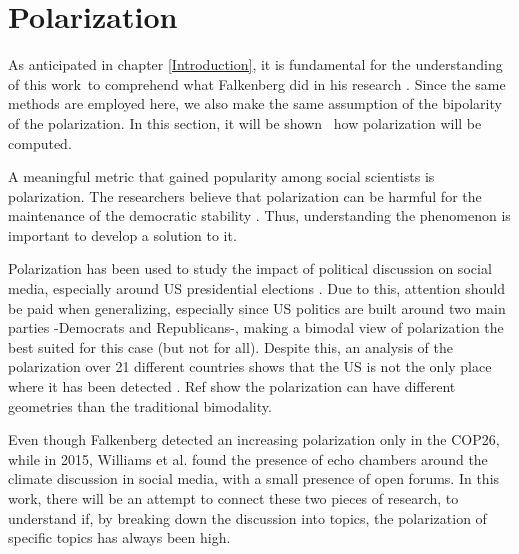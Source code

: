 \section[Polarization]{Polarization}
As anticipated in chapter \ref{Introduction}, it is fundamental for the understanding of this work to comprehend what Falkenberg did in his research \cite{falkenberg_growing_2022}. Since the same methods are employed here, we also make the same assumption of the bipolarity of the polarization. In this section, it will be shown  how polarization will be computed.

A meaningful metric that gained popularity among social scientists is polarization. The researchers believe that polarization can be harmful for the maintenance of the democratic stability \cite{mccoy_polarization_democracy_2018}. Thus, understanding the phenomenon is important to develop a solution to it.

Polarization has been used to study the impact of political discussion on social media, especially around US presidential elections  \cite{conover_political_2011}
\cite{flamino_shifting_2021} . Due to this, attention should be paid when generalizing, especially since US politics are built around two main parties -Democrats and Republicans-, making a bimodal view of polarization the best suited for this case (but not for all). Despite this, an analysis of the polarization over 21 different countries shows that the US is not the only place where it has been detected  \cite{gidron_toward_2019}. Ref
\cite{radicioni_networked_2021}
show the polarization can have different geometries than the traditional bimodality.

Even though Falkenberg detected an increasing polarization only in the COP26, while in 2015, Williams et al. \cite{williams_network_2015} found the presence of echo chambers around the climate discussion in social media, with a small presence of open forums. In this work, there will be an attempt to connect these two pieces of research, to understand if, by breaking down the discussion into topics, the polarization of specific topics has always been high.

